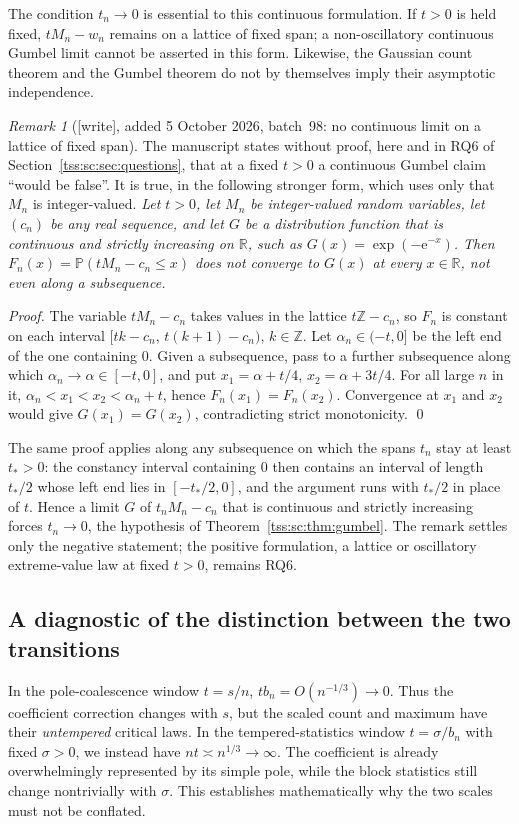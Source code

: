 \documentclass[11pt]{article}
\theoremstyle{remark}\newtheorem{remark}[theorem]{Remark}
\theoremstyle{definition}\newtheorem{definition}[theorem]{Definition}
\newcommand{\e}{\mathrm e}
\newcommand{\Prob}{\mathbb P}
\newcommand{\R}{\mathbb R}
\begin{document}
The condition $t_n\to0$ is essential to this continuous formulation. If $t>0$ is held fixed, $tM_n-w_n$ remains on a lattice of fixed span; a non-oscillatory continuous Gumbel limit cannot be asserted in this form. Likewise, the Gaussian count theorem and the Gumbel theorem do not by themselves imply their asymptotic independence.

\begin{remark}[\textsf{[write]}, added 5 October 2026, batch~98: no continuous limit on a lattice of fixed span]\label{tss:sc:rem:lattice}
The manuscript states without proof, here and in RQ6 of
Section~\ref{tss:sc:sec:questions}, that at a fixed $t>0$ a continuous
Gumbel claim ``would be false''. It is true, in the following stronger
form, which uses only that $M_n$ is integer-valued. \emph{Let $t>0$, let
$M_n$ be integer-valued random variables, let $(c_n)$ be any real
sequence, and let $G$ be a distribution function that is continuous and
strictly increasing on $\R$, such as $G(x)=\exp(-\e^{-x})$. Then
$F_n(x)=\Prob(tM_n-c_n\le x)$ does not converge to $G(x)$ at every
$x\in\R$, not even along a subsequence.}

\emph{Proof.} The variable $tM_n-c_n$ takes values in the lattice
$t\mathbb Z-c_n$, so $F_n$ is constant on each interval
$[tk-c_n,\,t(k+1)-c_n)$, $k\in\mathbb Z$. Let $\alpha_n\in(-t,0]$ be the
left end of the one containing $0$. Given a subsequence, pass to a further
subsequence along which $\alpha_n\to\alpha\in[-t,0]$, and put
$x_1=\alpha+t/4$, $x_2=\alpha+3t/4$. For all large $n$ in it,
$\alpha_n<x_1<x_2<\alpha_n+t$, hence $F_n(x_1)=F_n(x_2)$. Convergence at
$x_1$ and $x_2$ would give $G(x_1)=G(x_2)$, contradicting strict
monotonicity. \qed

The same proof applies along any subsequence on which the spans $t_n$
stay at least $t_\ast>0$: the constancy interval containing $0$ then
contains an interval of length $t_\ast/2$ whose left end lies in
$[-t_\ast/2,0]$, and the argument runs with $t_\ast/2$ in place of $t$. Hence a limit $G$ of
$t_nM_n-c_n$ that is continuous and strictly increasing forces $t_n\to0$,
the hypothesis of Theorem~\ref{tss:sc:thm:gumbel}. The remark settles only the negative statement; the
positive formulation, a lattice or oscillatory extreme-value law at fixed
$t>0$, remains RQ6.
\end{remark}

\subsection{A diagnostic of the distinction between the two transitions}
In the pole-coalescence window $t=s/n$,
$t b_n=O(n^{-1/3})\to0$. Thus the coefficient correction changes with $s$, but the scaled count and maximum have their \emph{untempered} critical laws. In the tempered-statistics window $t=\sigma/b_n$ with fixed $\sigma>0$, we instead have $nt\asymp n^{1/3}\to\infty$. The coefficient is already overwhelmingly represented by its simple pole, while the block statistics still change nontrivially with $\sigma$. This establishes mathematically why the two scales must not be conflated.
\end{document}
